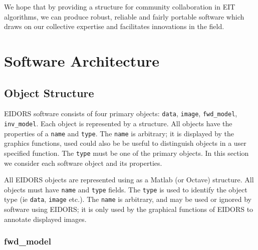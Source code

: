 \documentclass[12pt]{iopart}
\begin{document}
\begin{itemize}
%

\end{itemize}
We hope that by providing a structure for community collaboration
in EIT algorithms, we can produce robust,
reliable and fairly portable software which draws on our collective
expertise and facilitates innovations in the field.

\section{Software Architecture}

\subsection{Object Structure}

EIDORS software consists of four primary objects:
{\tt data},
{\tt image},
{\tt fwd\_model},
{\tt inv\_model}. Each object is represented by a
structure. All objects have the properties of a
{\tt name} and {\tt type}. The {\tt name} is
arbitrary; it is displayed by the graphics functions,
used could also be be useful to distinguish objects
in a user specified function. The {\tt type} must
be one of the primary objects. In this section we
consider each software object and its properties.


All EIDORS objects are represented using as a Matlab
(or Octave) structure. All objects must have 
{\tt name} and {\tt type} fields. 
The {\tt type} is used to identify the object type 
(ie {\tt data}, {\tt image} etc.).
The {\tt name} is arbitrary, and may be used or ignored
by software using EIDORS; it is only used by the
graphical functions of EIDORS to annotate displayed images.

\subsubsection{fwd\_model}
\end{document}
